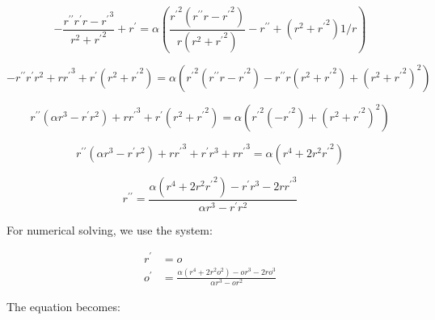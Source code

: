 \documentclass[12pt, a4paper]{report}
\begin{document}
\begin{equation}
-\frac{r^{\prime\prime}r^{\prime}r - {r^\prime}^3}{r^2 + {r^\prime}^2} + r^\prime =
\alpha \left(\frac{{r^\prime}^2 (r^{\prime\prime}r - {r^\prime}^2)}{r(r^2 + {r^\prime}^2)} - r^{\prime\prime} + (r^2+{r^\prime}^2)1/r\right)
\end{equation}

\begin{equation}
-r^{\prime\prime}r^{\prime}r^2 + r{r^\prime}^3 + r^\prime(r^2 + {r^\prime}^2) =
\alpha \left({r^\prime}^2 (r^{\prime\prime}r - {r^\prime}^2) - r^{\prime\prime}r(r^2 + {r^\prime}^2) + (r^2+{r^\prime}^2)^2\right)
\end{equation}

\begin{equation}
r^{\prime\prime}\left(\alpha r^3 - r^{\prime}r^2\right) + r{r^\prime}^3 + r^\prime(r^2 + {r^\prime}^2) =
\alpha \left({r^\prime}^2 (- {r^\prime}^2) + (r^2+{r^\prime}^2)^2\right)
\end{equation}

\begin{equation}
r^{\prime\prime}\left(\alpha r^3 - r^{\prime}r^2\right) + r{r^\prime}^3 + r^\prime r^3 + r{r^\prime}^3 =
\alpha \left(r^4 + 2r^2 {r^\prime}^2\right)
\end{equation}

\begin{equation}
r^{\prime\prime} =
\frac{\alpha \left(r^4 + 2r^2 {r^\prime}^2\right) - r^\prime r^3 - 2r{r^\prime}^3 }{\alpha r^3 - r^{\prime}r^2} 
\end{equation}

For numerical solving, we use the system:

\begin {align}
r^\prime &= o \\
o^\prime &= \frac{\alpha \left(r^4 + 2r^2 o^2\right) - o r^3 - 2r o^3 }{\alpha r^3 - o r^2} 
\end{align}

The equation becomes:
\end{document}
